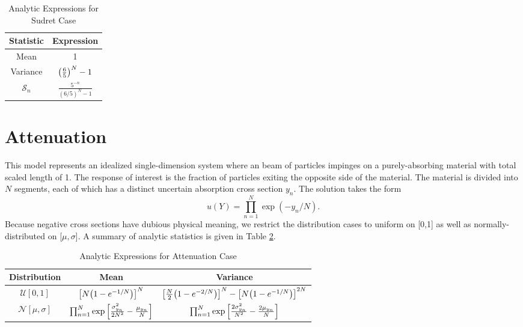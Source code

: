 \begin{table}[H]
  \centering
  \begin{tabular}{c c}
    Statistic & Expression \\\hline
    Mean & 1 \\
    Variance & $\qty(\frac{6}{5})^N - 1$ \\
    $\mathcal{S}_n$ & $\frac{5^{-n}}{(6/5)^N-1}$
  \end{tabular}
  \caption{Analytic Expressions for Sudret Case}
  \label{tab:sudret}
\end{table}


\section{Attenuation}\label{mod:attenuation}
This model represents an idealized single-dimension system where an beam of particles impinges on a
purely-absorbing material with total scaled length of 1.  The response of interest is the fraction of
particles exiting the opposite side of the material.  The material is divided into $N$ segments, each of which
has a distinct uncertain absorption cross section $y_n$.  The solution takes the form
\begin{equation}
  u(Y) = \prod_{n=1}^N \exp(-y_n/N).
\end{equation}
Because negative cross sections have dubious physical meaning, we restrict the distribution cases to uniform
on [0,1] as well as normally-distributed on [$\mu,\sigma$].  A summary of analytic statistics is given in
Table \ref{tab:attenuation moments}.

\begin{table}[H]
  \centering
  \begin{tabular}{c|c|c}
    Distribution & Mean & Variance \\\hline
    $\mathcal{U}[0,1]$ & $\qty[N\qty(1-e^{-1/N})]^N$ & $\qty[\frac{N}{2}\qty(1-e^{-2/N})]^N -
                       \qty[N\qty(1-e^{-1/N})]^{2N}$ \\
    $\mathcal{N}[\mu,\sigma]$ & $\prod_{n=1}^N \exp\qty[\frac{\sigma_{y_n}^2}{2N^2}-\frac{\mu_{y_n}}{N}]$
    & $\prod_{n=1}^N \exp\qty[\frac{2\sigma_{y_n}^2}{N^2} - \frac{2\mu_{y_n}}{N}]$
  \end{tabular}
  \caption{Analytic Expressions for Attenuation Case}
  \label{tab:attenuation moments}
\end{table}

